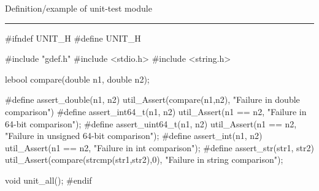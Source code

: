 
Definition/example of unit-test module

\bigskip
\hrule
\code
#ifndef UNIT_H
#define UNIT_H

#include "gdef.h"
#include <stdio.h>
#include <string.h>

lebool compare(double n1, double n2);

#define assert_double(n1, n2) util_Assert(compare(n1,n2), "Failure in double comparison")
#define assert_int64_t(n1, n2) util_Assert(n1 == n2, "Failure in 64-bit comparison");
#define assert_uint64_t(n1, n2) util_Assert(n1 == n2, "Failure in unsigned 64-bit comparison");
#define assert_int(n1, n2) util_Assert(n1 == n2, "Failure in int comparison");
#define assert_str(str1, str2) util_Assert(compare(strcmp(str1,str2),0), "Failure in string comparison");
\endcode

\code
void unit_all();
#endif
\endcode
